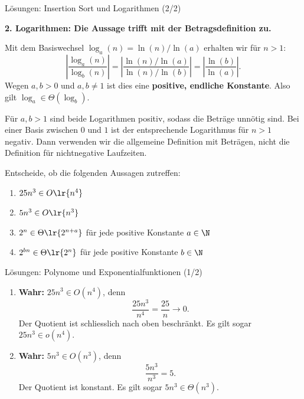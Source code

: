\begin{frame}{Lösungen: Insertion Sort und Logarithmen (2/2)}
	\begin{myanswer}
		\textbf{2. Logarithmen: Die Aussage trifft mit der Betragsdefinition zu.}

		Mit dem Basiswechsel $\log_a(n)=\ln(n)/\ln(a)$ erhalten wir für $n>1$:
		\[
			\left|\frac{\log_a(n)}{\log_b(n)}\right|
			=\left|\frac{\ln(n)/\ln(a)}{\ln(n)/\ln(b)}\right|
			=\left|\frac{\ln(b)}{\ln(a)}\right|.
		\]
		Wegen $a,b>0$ und $a,b\neq 1$ ist dies eine \textbf{positive, endliche Konstante}. Also gilt $\log_a\in\Theta(\log_b)$.

		\medskip
		Für $a,b>1$ sind beide Logarithmen positiv, sodass die Beträge unnötig sind. Bei einer Basis zwischen $0$ und $1$ ist der entsprechende Logarithmus für $n>1$ negativ. Dann verwenden wir die allgemeine Definition mit Beträgen, nicht die Definition für nichtnegative Laufzeiten.
	\end{myanswer}
\end{frame}

\begin{frame}
	\begin{myexercise}\label{myexercise:complexity01}
		Entscheide, ob die folgenden Aussagen zutreffen:
		\begin{enumerate}
			\item $25n^3 \in O\lr{n^4}$
			\item $5n^3 \in O\lr{n^3}$
			\item $2^n \in \Theta\lr{2^{n + a}}$ für jede positive Konstante $a\in\N$
			\item $2^{bn} \in \Theta\lr{2^n}$ für jede positive Konstante $b\in\N$
		\end{enumerate}
	\end{myexercise}
\end{frame}

\begin{frame}{Lösungen: Polynome und Exponentialfunktionen (1/2)}
	\begin{myanswer}
		\begin{enumerate}
			\item \textbf{Wahr:} $25n^3\in O(n^4)$, denn
			\[
				\frac{25n^3}{n^4}=\frac{25}{n}\longrightarrow 0.
			\]
			Der Quotient ist schliesslich nach oben beschränkt. Es gilt sogar $25n^3\in o(n^4)$.
			\item \textbf{Wahr:} $5n^3\in O(n^3)$, denn
			\[
				\frac{5n^3}{n^3}=5.
			\]
			Der Quotient ist konstant. Es gilt sogar $5n^3\in\Theta(n^3)$.
		\end{enumerate}
	\end{myanswer}
\end{frame}

